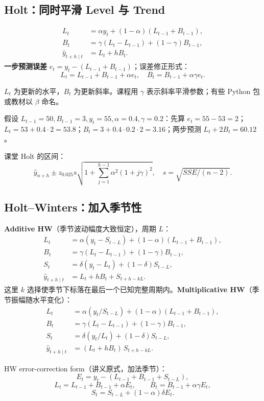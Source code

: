 \documentclass[UTF8,fontset=fandol,10.5pt,a4paper]{ctexart}
\newcommand{\eng}[1]{{\sffamily\color{navy}#1}}
\begin{document}
\subsection{Holt：同时平滑 Level 与 Trend}
\begin{keybox}
\begin{align*}
L_t&=\alpha y_t+(1-\alpha)(L_{t-1}+B_{t-1}),\\
B_t&=\gamma(L_t-L_{t-1})+(1-\gamma)B_{t-1},\\
\hat y_{t+h\mid t}&=L_t+hB_t.
\end{align*}
\textbf{一步预测误差} $e_t=y_t-(L_{t-1}+B_{t-1})$；误差修正形式：
\[L_t=L_{t-1}+B_{t-1}+\alpha e_t,\quad B_t=B_{t-1}+\alpha\gamma e_t.\]
\end{keybox}
$L_t$ 为更新的水平，$B_t$ 为更新斜率。课程用 $\gamma$ 表示斜率平滑参数；有些 Python 包或教材以 $\beta$ 命名。
\begin{exam}
假设 $L_{t-1}=50,B_{t-1}=3,y_t=55,\alpha=0.4,\gamma=0.2$：先算 $e_t=55-53=2$；$L_t=53+0.4\cdot2=53.8$；$B_t=3+0.4\cdot0.2\cdot2=3.16$；两步预测 $L_t+2B_t=60.12$。
\end{exam}
课堂 Holt 的区间：
\[\hat y_{n+h}\pm z_{0.025}s\sqrt{1+\sum_{j=1}^{h-1}\alpha^2(1+j\gamma)^2},\quad s=\sqrt{SSE/(n-2)}.\]
\par\smallskip{}\par\smallskip
\subsection{Holt--Winters：加入季节性}
\textbf{Additive HW}（季节波动幅度大致恒定），周期 $L$：
\begin{align*}
L_t &=\alpha(y_t-S_{t-L})+(1-\alpha)(L_{t-1}+B_{t-1}),\\
B_t &=\gamma(L_t-L_{t-1})+(1-\gamma)B_{t-1},\\
S_t &=\delta(y_t-L_t)+(1-\delta)S_{t-L},\\
\hat y_{t+h\mid t} &=L_t+hB_t+S_{t+h-kL}.
\end{align*}
这里 $k$ 选择使季节下标落在最后一个已知完整周期内。\textbf{Multiplicative HW}（季节振幅随水平变化）：
\begin{align*}
L_t &=\alpha(y_t/S_{t-L})+(1-\alpha)(L_{t-1}+B_{t-1}),\\
B_t &=\gamma(L_t-L_{t-1})+(1-\gamma)B_{t-1},\\
S_t &=\delta(y_t/L_t)+(1-\delta)S_{t-L},\\
\hat y_{t+h\mid t} &=(L_t+hB_t)\,S_{t+h-kL}.
\end{align*}
\par\smallskip{}\par\smallskip
\begin{keybox}
HW \eng{error-correction form}（讲义原式，加法季节）：
\[E_t=y_t-(L_{t-1}+B_{t-1}+S_{t-L}),\]
\[L_t=L_{t-1}+B_{t-1}+\alpha E_t,\qquad B_t=B_{t-1}+\alpha\gamma E_t,\]
\[S_t=S_{t-L}+(1-\alpha)\delta E_t.\]
\end{keybox}
\end{document}
